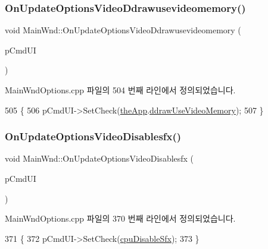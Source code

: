 \subsubsection{\texorpdfstring{On\+Update\+Options\+Video\+Ddrawusevideomemory()}{OnUpdateOptionsVideoDdrawusevideomemory()}}
{\footnotesize\ttfamily void Main\+Wnd\+::\+On\+Update\+Options\+Video\+Ddrawusevideomemory (\begin{DoxyParamCaption}\item[{C\+Cmd\+UI $\ast$}]{p\+Cmd\+UI }\end{DoxyParamCaption})\hspace{0.3cm}{\ttfamily [protected]}}



Main\+Wnd\+Options.\+cpp 파일의 504 번째 라인에서 정의되었습니다.


\begin{DoxyCode}
505 \{
506   pCmdUI->SetCheck(\mbox{\hyperlink{_v_b_a_8cpp_a8095a9d06b37a7efe3723f3218ad8fb3}{theApp}}.\mbox{\hyperlink{class_v_b_a_a875d3208513412753e2e946b8d6e6ce3}{ddrawUseVideoMemory}});
507 \}
\end{DoxyCode}
\mbox{\label{class_main_wnd_aab300c45188274983a69dcddb774b1d8}} 
\subsubsection{\texorpdfstring{On\+Update\+Options\+Video\+Disablesfx()}{OnUpdateOptionsVideoDisablesfx()}}
{\footnotesize\ttfamily void Main\+Wnd\+::\+On\+Update\+Options\+Video\+Disablesfx (\begin{DoxyParamCaption}\item[{C\+Cmd\+UI $\ast$}]{p\+Cmd\+UI }\end{DoxyParamCaption})\hspace{0.3cm}{\ttfamily [protected]}}



Main\+Wnd\+Options.\+cpp 파일의 370 번째 라인에서 정의되었습니다.


\begin{DoxyCode}
371 \{
372   pCmdUI->SetCheck(\mbox{\hyperlink{_globals_8cpp_a71b9f49fb3c59657da7fa489a52b615e}{cpuDisableSfx}});
373 \}
\end{DoxyCode}
\mbox{\label{class_main_wnd_a81fdf41b0bef9ec1cef244c686c5d740}} 
